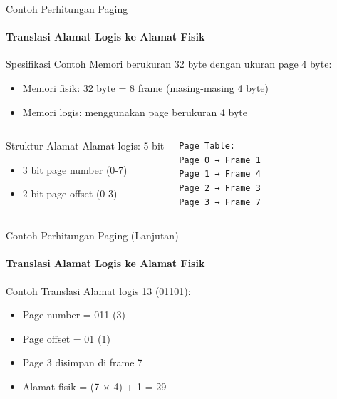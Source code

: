 \documentclass[10pt,aspectratio=169]{beamer}
\begin{document}
\begin{frame}[fragile]{Contoh Perhitungan Paging}
    \framesubtitle{Translasi Alamat Logis ke Alamat Fisik}
    
    \begin{block}{Spesifikasi Contoh}
        Memori berukuran 32 byte dengan ukuran page 4 byte:
        \begin{itemize}
            \item Memori fisik: 32 byte = 8 frame (masing-masing 4 byte)
            \item Memori logis: menggunakan page berukuran 4 byte
        \end{itemize}
    \end{block}
    
    \begin{columns}[T]
            \begin{alertblock}{Struktur Alamat}
                Alamat logis: 5 bit
                \begin{itemize}
                    \item 3 bit page number (0-7)
                    \item 2 bit page offset (0-3)
                \end{itemize}
            \end{alertblock}
            
            \begin{verbatim}
Page Table:
Page 0 → Frame 1
Page 1 → Frame 4
Page 2 → Frame 3
Page 3 → Frame 7
            \end{verbatim}
    \end{columns}
\end{frame}

\begin{frame}[fragile]{Contoh Perhitungan Paging (Lanjutan)}
    \framesubtitle{Translasi Alamat Logis ke Alamat Fisik}
    
    \begin{block}{Contoh Translasi}
        Alamat logis 13 (01101):
        \begin{itemize}
            \item Page number = 011 (3)
            \item Page offset = 01 (1)
            \item Page 3 disimpan di frame 7
            \item Alamat fisik = (7 $\times$ 4) + 1 = 29
        \end{itemize}
    \end{block}
\end{frame}
\end{document}
